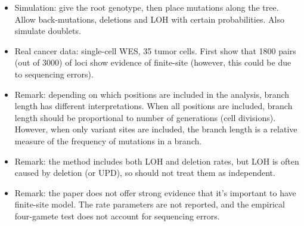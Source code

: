 \documentclass{report}
\begin{document}
\begin{itemize}
	\item Simulation: give the root genotype, then place mutations along the tree. Allow back-mutations, deletions and LOH with certain probabilities. Also simulate doublets. 
	
	\item Real cancer data: single-cell WES, 35 tumor cells. First show that 1800 pairs (out of 3000) of loci show evidence of finite-site (however, this could be due to sequencing errors). 
	
	\item Remark: depending on which positions are included in the analysis, branch length has different interpretations. When all positions are included, branch length should be proportional to number of generations (cell divisions). However, when only variant sites are included, the branch length is a relative measure of the frequency of mutations in a branch. 
	
	\item Remark: the method includes both LOH and deletion rates, but LOH is often caused by deletion (or UPD), so should not treat them as independent. 
	
	\item Remark: the paper does not offer strong evidence that it's important to have finite-site model. The rate parameters are not reported, and the empirical four-gamete test does not account for sequencing errors. 
\end{itemize}
\end{document}
